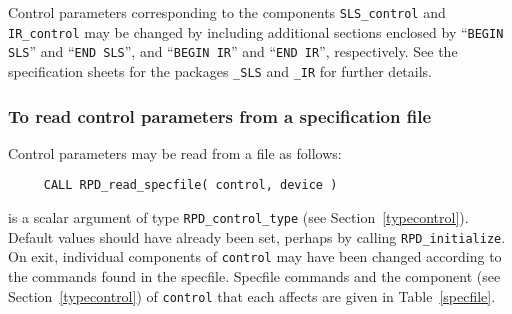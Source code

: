 \documentclass{galahad}
\newcommand{\packagename}{RPD}
\begin{document}
\begin{description}
Control parameters corresponding to the components
{\tt SLS\_control}
and
{\tt IR\_control} may be changed by including additional sections enclosed by
``{\tt BEGIN SLS}'' and
``{\tt END SLS}'', and
``{\tt BEGIN IR}'' and
``{\tt END IR}'', respectively.
See the specification sheets for the packages
{\tt \libraryname\_SLS}
and
{\tt \libraryname\_IR}
for further details.

\subsubsection{To read control parameters from a specification file}
\label{readspec}

Control parameters may be read from a file as follows:
\hskip0.5in
\def\baselinestretch{0.8} {\tt \begin{verbatim}
     CALL RPD_read_specfile( control, device )
\end{verbatim}}
\def\baselinestretch{1.0}

\begin{description}
 is a scalar \intentinout argument of type
{\tt \packagename\_control\_type}
(see Section~\ref{typecontrol}).
Default values should have already been set, perhaps by calling
{\tt \packagename\_initialize}.
On exit, individual components of {\tt control} may have been changed
according to the commands found in the specfile. Specfile commands and
the component (see Section~\ref{typecontrol}) of {\tt control}
that each affects are given in Table~\ref{specfile}.


\end{description}
\end{description}
\end{document}
